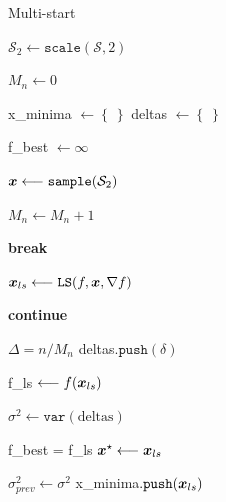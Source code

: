 \begin{algorithm}
\caption{Multi-start}\label{algo:multistart}
\vspace{8pt}
\nosemic
\SetAlgoLined
{}

$\mathcal{S}_2 \longleftarrow \texttt{scale}(\mathcal{S}, 2) $ \;

$M_n \longleftarrow 0$ \;

x\_minima $ \longleftarrow \left\lbrace \: \right\rbrace$ \;
deltas $ \longleftarrow \left\lbrace \: \right\rbrace$ \;

f\_best $\longleftarrow \infty$ \;

 {

     {
        $\boldsymbol{x} \longleftarrow \texttt{sample}(\mathcal{S}_2) $ \;

        $M_n \longleftarrow M_n + 1$ \;

         {
            \textbf{break} \;
        }
    }

    $\boldsymbol{x}_{ls} \longleftarrow \texttt{LS}( f, \boldsymbol{x}, \nabla f ) $\;

     {
        \textbf{continue} \;
    }

    $\Delta = n / M_n$ \;
    deltas$.\texttt{push}(\delta)$ \;

    f\_ls $\longleftarrow f(\boldsymbol{x}_{ls}) $ \;

    $\sigma^2 \longleftarrow \texttt{var}(\text{deltas})$ \;

     {
        f\_best = f\_ls \;
        $\boldsymbol{x}^\star \longleftarrow \boldsymbol{x}_{ls}$ \;
    }

     {
        $\sigma^2_{prev} \longleftarrow \sigma^2$ \;
        x\_minima$.\texttt{push}( \boldsymbol{x}_{ls} )$ \;
    } 
}
\;


\end{algorithm}

